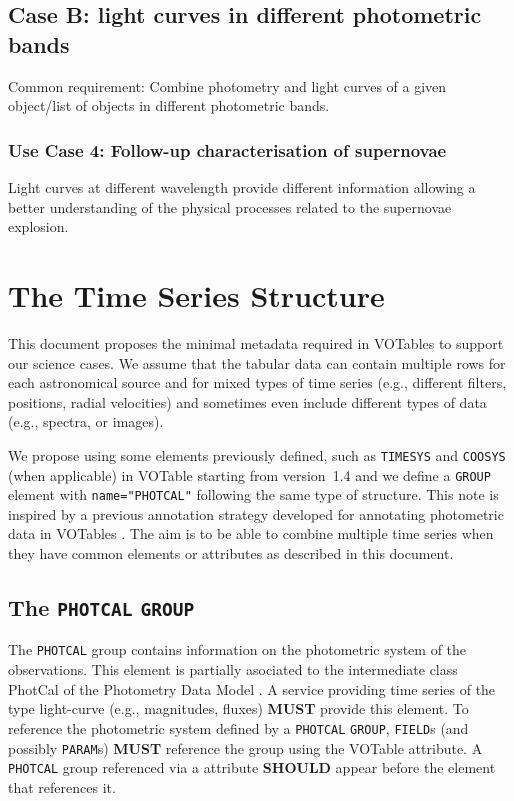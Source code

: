 \documentclass[11pt,a4paper]{ivoa} 
\let\fg=\color
\def\elem#1{{\tt{\fg{DarkRed}#1}}}
\def\attrval#1#2{{\tt{\fg{DarkRed}#1}="{\fg{DarkPurple}#2}"}}
\begin{document}
\subsection{Case B: light curves in different photometric bands}
Common requirement: Combine photometry and light curves of a given
object/list of objects in different photometric bands.

\subsubsection{Use Case 4: Follow-up characterisation of supernovae}
Light curves at different wavelength provide different information
allowing a better understanding of the physical processes related to
the supernovae explosion.

\section{The Time Series Structure}
\label{elem:TIMESERIES}
This document proposes the minimal metadata required in VOTables to
support our science cases. We assume that the tabular data can contain
multiple rows for each astronomical source and for mixed types of time
series (e.g., different filters, positions, radial velocities) and
sometimes even include different types of data (e.g., spectra, or
images).

We propose using some elements previously defined, such as
\elem{TIMESYS} and \elem{COOSYS} (when applicable) in VOTable starting
from version~1.4 \citep{2019ivoa.spec.1021O} and we define a \elem{GROUP}
element with \attrval{name}{PHOTCAL} following the same type of structure.
This note is inspired by
a previous annotation strategy developed for annotating photometric
data in VOTables \citep{note:seb2010-1}. The aim is to be able to combine
multiple time series when they have common elements or attributes as
described in this document. 

%
%

\subsection{The \texttt{PHOTCAL} \elem{GROUP}}
The \texttt{PHOTCAL} group contains information on the photometric
system of the observations. This element is partially asociated to the
intermediate class PhotCal of the Photometry Data Model
\citep{2013ivoa.spec.1005S}. A service providing time series of the
type light-curve (e.g., magnitudes, fluxes) \textbf{MUST} provide this
element. To reference the photometric system defined by a
\texttt{PHOTCAL} \elem{GROUP}, \elem{FIELD}s (and possibly
\elem{PARAM}s) \textbf{MUST} reference the group using the VOTable
 attribute. A \texttt{PHOTCAL} group referenced via a
 attribute \textbf{SHOULD} appear before the element that
references it.
\end{document}
